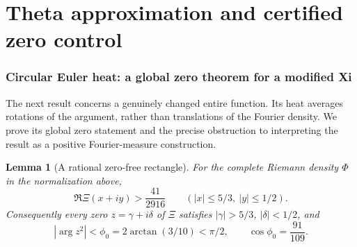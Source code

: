 \documentclass[11pt]{article}
\newtheorem{lemma}[theorem]{Lemma}
\theoremstyle{remark}\newtheorem{remark}[theorem]{Remark}
\begin{document}
\part{Theta approximation and certified zero control}

\section{Circular Euler heat: a global zero theorem for a modified Xi}
The next result concerns a genuinely changed entire function.
Its heat averages rotations of the argument, rather than translations
of the Fourier density. We prove its global zero statement and the
precise obstruction to interpreting the result as a positive
Fourier-measure construction.

\begin{lemma}[A rational zero-free rectangle]\label{lem:euler-low-box}
For the complete Riemann density $\Phi$ in the normalization above,
\[
  \Re\Xi(x+iy)>\frac{41}{2916}
       \qquad (|x|\le5/3,\ |y|\le1/2).                    \tag{EUL1}
\]
Consequently every zero $z=\gamma+i\delta$ of $\Xi$ satisfies
$|\gamma|>5/3$, $|\delta|<1/2$, and
\[
 |\arg z^2|<\phi_0=2\arctan(3/10)<\pi/2,\qquad
             \cos\phi_0=\frac{91}{109}.                 \tag{EUL2}
\]
\end{lemma}
\end{document}
